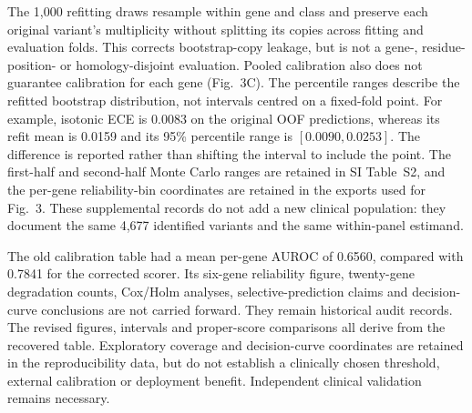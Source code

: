 The 1,000 refitting draws resample within gene and class and preserve each
original variant's multiplicity without splitting its copies across
fitting and evaluation folds. This corrects bootstrap-copy leakage, but
is not a gene-, residue-position- or homology-disjoint evaluation. Pooled
calibration also does not guarantee calibration for each gene (Fig.~3C).
The percentile ranges describe the refitted bootstrap distribution, not
intervals centred on a fixed-fold point. For example, isotonic ECE is
0.0083 on the original OOF predictions, whereas its refit mean is 0.0159
and its 95\% percentile range is $[0.0090,0.0253]$. The difference is
reported rather than shifting the interval to include the point. The
first-half and second-half Monte Carlo ranges are retained in SI Table~S2,
and the per-gene reliability-bin coordinates are retained in the exports
used for Fig.~3. These supplemental records do not add a new clinical
population: they document the same 4,677 identified variants and the same
within-panel estimand.

The old calibration table had a mean per-gene AUROC of 0.6560, compared
with 0.7841 for the corrected scorer. Its six-gene reliability figure,
twenty-gene degradation counts, Cox/Holm analyses, selective-prediction
claims and decision-curve conclusions are not carried forward. They
remain historical audit records. The revised figures, intervals and
proper-score comparisons all derive from the recovered table.
Exploratory coverage and decision-curve coordinates are retained in the
reproducibility data, but do not establish a clinically chosen threshold,
external calibration or deployment benefit. Independent clinical
validation remains necessary.

